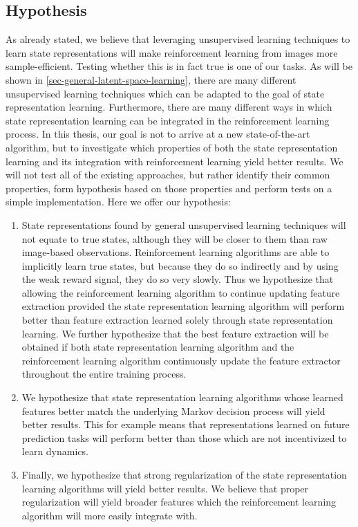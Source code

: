 \subsection{Hypothesis}
\label{subsec-hypothesis}
As already stated, we believe that leveraging unsupervised learning techniques
to learn state representations will make reinforcement learning from images
more sample-efficient.
Testing whether this is in fact true is one of our tasks.
As will be shown in \ref{sec-general-latent-space-learning}, there are many different unsupervised learning
techniques which can be adapted to the goal of state representation learning.
Furthermore, there are many different ways in which state representation learning can be integrated
in the reinforcement learning process.
In this thesis, our goal is not to arrive at a new state-of-the-art algorithm,
but to investigate which properties of both the state representation learning and its integration
with reinforcement learning yield better results.
We will not test all of the existing approaches, but rather identify their common properties,
form hypothesis based on those properties and perform tests on a simple implementation.
Here we offer our hypothesis:
\begin{enumerate}
		\item State representations found by general unsupervised learning techniques 
		will not equate to true states, although they will be closer to them than
		raw image-based observations. Reinforcement learning algorithms are able
		to implicitly learn true states, but because they do so indirectly and by using
		the weak reward signal, they do so very slowly.
		Thus we hypothesize that allowing the reinforcement learning algorithm to continue updating
		feature extraction provided the state representation learning algorithm will perform better
		than feature extraction learned solely through state representation learning.
		We further hypothesize that the best feature extraction will be obtained if both
		state representation learning algorithm and the reinforcement learning algorithm 
		continuously update the feature extractor throughout the entire training process.
\item We hypothesize that state representation learning algorithms whose learned features better match the underlying
		Markov decision process will yield better results.
		This for example means that representations learned on future prediction tasks will
		perform better than those which are not incentivized to learn dynamics.
\item Finally, we hypothesize that strong regularization of the state representation learning
		algorithms will yield better results. We believe that proper regularization will
		yield broader features which the reinforcement learning algorithm will 
		more easily integrate with.
\end{enumerate}




